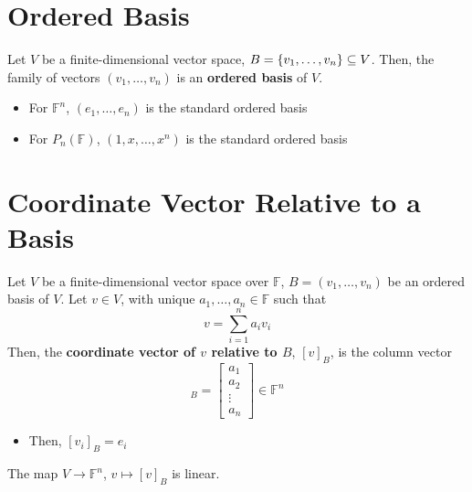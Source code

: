 \documentclass[letterpaper,12pt]{article}
\begin{document}
\section*{Ordered Basis}
\begin{definition}
Let $V$ be a finite-dimensional vector space, $B = \left\{ v_1, \dots, v_n \right\} \subseteq V$. Then, the family of vectors $(v_1, \dots, v_n)$ is an \textbf{ordered basis} of $V$.
\begin{itemize}
    \item For $\mathbb{F}^n$, $(e_1, \dots, e_n)$ is the standard ordered basis
    \item For $P_{n}(\mathbb{F})$, $(1, x, \dots, x^n)$ is the standard ordered basis
\end{itemize}
\end{definition}

\section*{Coordinate Vector Relative to a Basis}
\begin{definition}
Let $V$ be a finite-dimensional vector space over $\mathbb{F}$, $B = (v_1, \dots, v_n)$ be an ordered basis of $V$. Let $v \in V$, with unique $a_1, \dots, a_n \in \mathbb{F}$ such that
\begin{equation*}
    v = \sum_{i=1}^n a_i v_i
\end{equation*}
Then, the \textbf{coordinate vector of $v$ relative to $B$}, $[v]_{B}$, is the column vector
\begin{equation*}
    [x]_{B} = \begin{bmatrix} a_1 \\ a_2 \\ \vdots \\ a_n \end{bmatrix} \in \mathbb{F}^n
\end{equation*}
\begin{itemize}
    \item Then, $[v_i]_{B} = e_i$
\end{itemize}
\end{definition}

\begin{corollary}
The map $V \rightarrow \mathbb{F}^n$, $v \mapsto [v]_{B}$ is linear.
\end{corollary}
\end{document}

